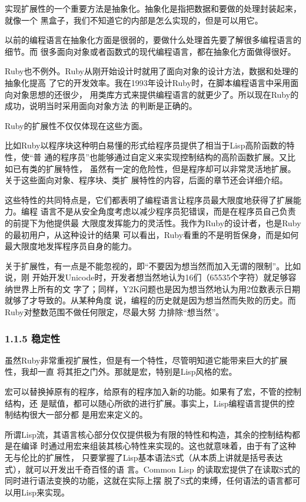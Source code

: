 \documentclass[11pt]{ctexart}
\begin{document}
实现扩展性的一个重要方法是抽象化。抽象化是指把数据和要做的处理封装起来，就像一个
黑盒子，我们不知道它的内部是怎么实现的，但是可以用它。

以前的编程语言在抽象化方面是很弱的，要做什么处理首先要了解很多编程语言的细节。而
很多面向对象或者函数式的现代编程语言，都在抽象化方面做得很好。

Ruby也不例外。Ruby从刚开始设计时就用了面向对象的设计方法，数据和处理的抽象化提高
了它的开发效率。我在1993年设计Ruby时，在脚本编程语言中采用面向对象思想的还很少，
用类库方式来提供编程语言的就更少了。所以现在Ruby的成功，说明当时采用面向对象方法
的判断是正确的。

Ruby的扩展性不仅仅体现在这些方面。

比如Ruby以程序块这种明白易懂的形式给程序员提供了相当于Lisp高阶函数的特性，使“普
通的程序员”也能够通过自定义来实现控制结构的高阶函数扩展。又比如已有类的扩展特性，
虽然有一定的危险性，但是程序却可以非常灵活地扩展。关于这些面向对象、程序块、类扩
展特性的内容，后面的章节还会详细介绍。

这些特性的共同特点是，它们都表明了编程语言让程序员最大限度地获得了扩展能力。编程
语言不是从安全角度考虑以减少程序员犯错误，而是在程序员自己负责的前提下为他提供最
大限度发挥能力的灵活性。我作为Ruby的设计者，也是Ruby的最初用户，从这种设计的结果
可以看出，Ruby看重的不是明哲保身，而是如何最大限度地发挥程序员自身的能力。

关于扩展性，有一点是不能忽视的，即“不要因为想当然而加入无谓的限制”。比如说，刚
开始开发Unicode时，开发者想当然地认为16们（65535个字符）就足够容纳世界上所有的文
字了；同样，Y2K问题也是因为想当然地认为用2位数表示日期就够了才导致的。从某种角度
说，编程的历史就是因为想当然而失败的历史。而Ruby对整数范围不做任何限定，尽最大努
力排除“想当然”。

\subsubsection{1.1.5 稳定性}
\label{sec:org8d5dbe0}

虽然Ruby非常重视扩展性，但是有一个特性，尽管明知道它能带来巨大的扩展性，我却一直
将其拒之门外。那就是宏，特别是Lisp风格的宏。

宏可以替换掉原有的程序，给原有的程序加入新的功能。如果有了宏，不管的控制结构，还
是赋值，都可以随心所欲的进行扩展。事实上，Lisp编程语言提供的控制结构很大一部分都
是用宏来定义的。

所谓Lisp流，其语言核心部分仅仅提供极为有限的特性和构造，其余的控制结构都是在编译
时通过用宏来组装其核心特性来实现的。这也就意味着，由于有了这种无与伦比的扩展性，
只要掌握了Lisp基本语法S式（从本质上讲就是括号表达式），就可以开发出千奇百怪的语
言。Common Lisp 的读取宏提供了在读取S式的同时进行语法变换的功能，这就在实际上摆
脱了S式的束缚，任何语法的语言都可以用Lisp来实现。
\end{document}
